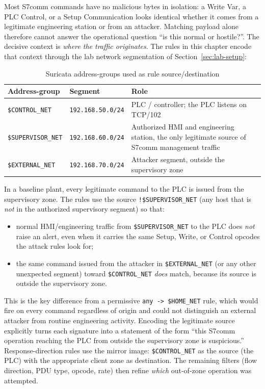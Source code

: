 \documentclass[../main.tex]{subfiles}
\begin{document}
Most S7comm commands have no malicious bytes in isolation: a Write Var, a PLC Control, or a Setup Communication looks identical whether it comes from a legitimate engineering station or from an attacker. Matching payload alone therefore cannot answer the operational question ``is this normal or hostile?''. The decisive context is \emph{where the traffic originates}. The rules in this chapter encode that context through the lab network segmentation of Section~\ref{sec:lab-setup}:

\begin{table}[H]
    \centering
    \caption{Suricata address-groups used as rule source/destination}
    \label{tab:rule-address-groups}
    \begin{tabular}{|l|l|p{6.4cm}|}
        \hline
        \textbf{Address-group} & \textbf{Segment} & \textbf{Role} \\
        \hline
        \texttt{\$CONTROL\_NET} & \texttt{192.168.50.0/24} & PLC / controller; the PLC listens on TCP/102 \\
        \hline
        \texttt{\$SUPERVISOR\_NET} & \texttt{192.168.60.0/24} & Authorized HMI and engineering station, the only legitimate source of S7comm management traffic \\
        \hline
        \texttt{\$EXTERNAL\_NET} & \texttt{192.168.70.0/24} & Attacker segment, outside the supervisory zone \\
        \hline
    \end{tabular}
\end{table}

In a baseline plant, every legitimate command to the PLC is issued from the supervisory zone. The rules use the source \texttt{!\$SUPERVISOR\_NET} (any host that is \emph{not} in the authorized supervisory segment) so that:

\begin{itemize}
    \item normal HMI/engineering traffic from \texttt{\$SUPERVISOR\_NET} to the PLC does \emph{not} raise an alert, even when it carries the same Setup, Write, or Control opcodes the attack rules look for;
    \item the same command issued from the attacker in \texttt{\$EXTERNAL\_NET} (or any other unexpected segment) toward \texttt{\$CONTROL\_NET} \emph{does} match, because its source is outside the supervisory zone.
\end{itemize}

This is the key difference from a permissive \texttt{any -> \$HOME\_NET} rule, which would fire on every command regardless of origin and could not distinguish an external attacker from routine engineering activity. Encoding the legitimate source explicitly turns each signature into a statement of the form ``this S7comm operation reaching the PLC from outside the supervisory zone is suspicious.'' Response-direction rules use the mirror image: \texttt{\$CONTROL\_NET} as the source (the PLC) with the appropriate client zone as destination. The remaining filters (flow direction, PDU type, opcode, rate) then refine \emph{which} out-of-zone operation was attempted.
\end{document}
